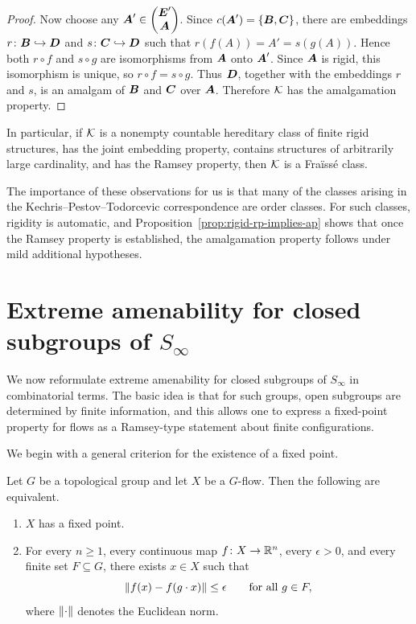 \begin{proof}
    Now choose any \(\boldsymbol{A}' \in \begin{pmatrix} \boldsymbol{E}' \\ \boldsymbol{A} \end{pmatrix}\). Since \(c(\boldsymbol{A}')=\{\boldsymbol{B},\boldsymbol{C}\}\), there are embeddings \(r \colon \boldsymbol{B} \hookrightarrow \boldsymbol{D}\) and \(s \colon \boldsymbol{C} \hookrightarrow \boldsymbol{D}\) such that \(r(f(A))=A'=s(g(A))\). Hence both \(r \circ f\) and \(s \circ g\) are isomorphisms from \(\boldsymbol{A}\) onto \(\boldsymbol{A}'\). Since \(\boldsymbol{A}\) is rigid, this isomorphism is unique, so \(r \circ f = s \circ g\).
    Thus \(\boldsymbol{D}\), together with the embeddings \(r\) and \(s\), is an amalgam of \(\boldsymbol{B}\) and \(\boldsymbol{C}\) over \(\boldsymbol{A}\). Therefore \(\mathcal{K}\) has the amalgamation property.
\end{proof}

In particular, if \(\mathcal{K}\) is a nonempty countable hereditary class of finite rigid structures, has the joint embedding property, contains structures of arbitrarily large cardinality, and has the Ramsey property, then \(\mathcal{K}\) is a Fraïssé class.

The importance of these observations for us is that many of the classes arising in the Kechris--Pestov--Todorcevic correspondence are order classes. For such classes, rigidity is automatic, and Proposition~\ref{prop:rigid-rp-implies-ap} shows that once the Ramsey property is established, the amalgamation property follows under mild additional hypotheses.



\section{Extreme amenability for closed subgroups of \texorpdfstring{\(S_\infty\)}{S-infinity}}

\label{sec:ea-closed-subgroups-sinf}

We now reformulate extreme amenability for closed subgroups of \(S_\infty\) in combinatorial terms. The basic idea is that for such groups, open subgroups are determined by finite information, and this allows one to express a fixed-point property for flows as a Ramsey-type statement about finite configurations.

We begin with a general criterion for the existence of a fixed point.

\begin{lemma}
    \label{lem:fixed-point-criterion}
    Let \(G\) be a topological group and let \(X\) be a \(G\)-flow. Then the following are equivalent.
    \begin{enumerate}
        \item[(i)] \(X\) has a fixed point.
        \item[(ii)] For every \(n \geq 1\), every continuous map \(f \colon X \to \mathbb{R}^n\), every \(\epsilon >0\), and every finite set \(F \subseteq G\), there exists \(x \in X\) such that
              \[
                  \left\lVert f(x)-f(g\cdot x)\right\rVert\leq \epsilon
                  \qquad\text{for all } g\in F,
              \]
              where \(\left\lVert \cdot\right\rVert\) denotes the Euclidean norm.
    \end{enumerate}
\end{lemma}

